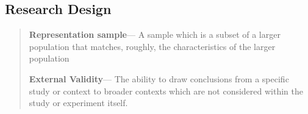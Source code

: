 \documentclass[12pt]{article}
\begin{document}
\subsection*{Research Design}

\begin{quote}
\textbf{Representation sample}--- A sample which is a subset of a larger population that matches, roughly, the characteristics of the larger population
    
\textbf{External Validity}--- The ability to draw conclusions from a specific study or context to broader contexts which are not considered within the study or experiment itself.
\end{quote}
\end{document}
